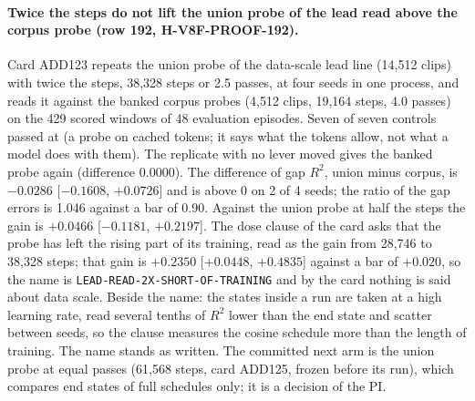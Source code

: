 \paragraph{Twice the steps do not lift the union probe of the lead read above the corpus probe (row 192, H-V8F-PROOF-192).} Card ADD123 repeats the union probe of the data-scale lead line (14,512 clips) with twice the steps, 38,328 steps or 2.5 passes, at four seeds in one process, and reads it against the banked corpus probes (4,512 clips, 19,164 steps, 4.0 passes) on the 429 scored windows of 48 evaluation episodes. Seven of seven controls passed at  (a probe on cached tokens; it says what the tokens allow, not what a model does with them). The replicate with no lever moved gives the banked probe again (difference 0.0000). The difference of gap $R^2$, union minus corpus, is $-0.0286$ [$-0.1608$, $+0.0726$] and is above 0 on 2 of 4 seeds; the ratio of the gap errors is 1.046 against a bar of 0.90. Against the union probe at half the steps the gain is $+0.0466$ [$-0.1181$, $+0.2197$]. The dose clause of the card asks that the probe has left the rising part of its training, read as the gain from 28,746 to 38,328 steps; that gain is $+0.2350$ [$+0.0448$, $+0.4835$] against a bar of $+0.020$, so the name is \texttt{LEAD-READ-2X-SHORT-OF-TRAINING} and by the card nothing is said about data scale. Beside the name: the states inside a run are taken at a high learning rate, read several tenths of $R^2$ lower than the end state and scatter between seeds, so the clause measures the cosine schedule more than the length of training. The name stands as written. The committed next arm is the union probe at equal passes (61,568 steps, card ADD125, frozen before its run), which compares end states of full schedules only; it is a decision of the PI.

